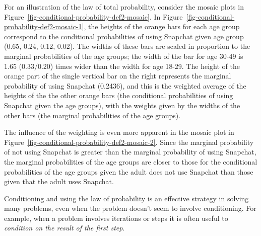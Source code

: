 \documentclass[
  letterpaper,
  DIV=11,
  numbers=noendperiod]{scrreprt}
\theoremstyle{plain}
\theoremstyle{definition}
\theoremstyle{definition}
\theoremstyle{definition}
\theoremstyle{remark}
\begin{document}
For an illustration of the law of total probability, consider the mosaic
plots in Figure~\ref{fig-conditional-probability-def2-mosaic}. In
Figure~\ref{fig-conditional-probability-def2-mosaic-1}, the heights of
the orange bars for each age group correspond to the conditional
probabilities of using Snapchat given age group (0.65, 0.24, 0.12,
0.02). The widths of these bars are scaled in proportion to the marginal
probabilities of the age groups; the width of the bar for age 30-49 is
1.65 (0.33/0.20) times wider than the width for age 18-29. The height of
the orange part of the single vertical bar on the right represents the
marginal probability of using Snapchat (0.2436), and this is the
weighted average of the heights of the the other orange bars (the
conditional probabilities of using Snapchat given the age groups), with
the weights given by the widths of the other bars (the marginal
probabilities of the age groups).

The influence of the weighting is even more apparent in the mosaic plot
in Figure~\ref{fig-conditional-probability-def2-mosaic-2}. Since the
marginal probability of not using Snapchat is greater than the marginal
probability of using Snapchat, the marginal probabilities of the age
groups are closer to those for the conditional probabilities of the age
groups given the adult does not use Snapchat than those given that the
adult uses Snapchat.

Conditioning and using the law of probability is an effective strategy
in solving many problems, even when the problem doesn't seem to involve
conditioning. For example, when a problem involves iterations or steps
it is often useful to \emph{condition on the result of the first step}.
\end{document}
